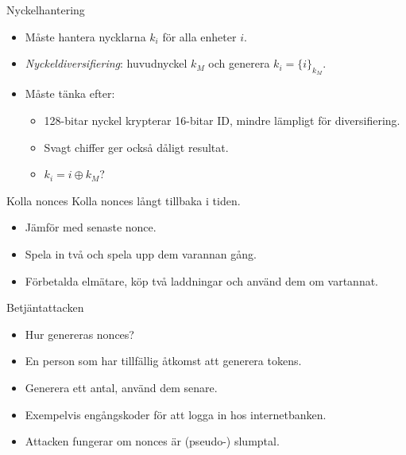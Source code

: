 \documentclass{beamer}
\theoremstyle{definition}
\theoremstyle{remark}
\DeclareMathOperator{\xor}{\oplus}
\newcommand{\encrypt}[2]{\{#1\}_{#2}}
\begin{document}
\begin{frame}{\insertsubsectionhead}{Nyckelhantering}
  \begin{itemize}
    \item Måste hantera nycklarna \(k_i\) för alla enheter \(i\).
    \item \emph{Nyckeldiversifiering}: huvudnyckel \(k_M\) och generera \(k_i 
      = \encrypt{i}{k_M}\).
    \item Måste tänka efter:
      \begin{itemize}
        \item 128-bitar nyckel krypterar 16-bitar ID, mindre lämpligt för 
          diversifiering.
        \item Svagt chiffer ger också dåligt resultat.
        \item \(k_i = i\xor k_M\)?
      \end{itemize}
  \end{itemize}
\end{frame}

\begin{frame}{\insertsubsectionhead}{Kolla nonces}
  Kolla nonces långt tillbaka i tiden.
  \begin{itemize}
    \item Jämför med senaste nonce.
    \item Spela in två och spela upp dem varannan gång.
    \item Förbetalda elmätare, köp två laddningar och använd dem om vartannat.
  \end{itemize}
\end{frame}

\begin{frame}{\insertsubsectionhead}{Betjäntattacken}
  \begin{itemize}
    \item Hur genereras nonces?
    \item En person som har tillfällig åtkomst att generera tokens.
    \item Generera ett antal, använd dem senare.
    \item Exempelvis engångskoder för att logga in hos internetbanken.
    \item Attacken fungerar om nonces är (pseudo-) slumptal.
  \end{itemize}
\end{frame}
\end{document}
